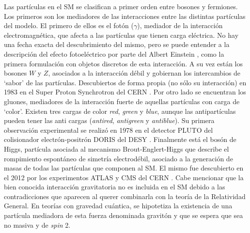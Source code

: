 Las partículas en el SM se clasifican a primer orden entre bosones y fermiones. Los primeros son los mediadores de las interacciones entre las distintas partículas del modelo. El primero de ellos es el fotón ($\gamma$), mediador de la interacción electromagnética, que afecta a las partículas que tienen carga eléctrica. No hay una fecha exacta del descubrimiento del mismo, pero se puede entender a la descripción del efecto fotoeléctrico por parte del Albert Einstein \cite{einstein}, como la primera formulación con objetos discretos de esta interacción. A su vez están los bosones $W$ y $Z$, asociados a la interacción débil y gobiernan los intercambios de `sabor' de las partículas. Descubiertos de forma propia (no sólo su interacción) en 1983 en el Super Proton Synchrotron del CERN . Por otro lado se encuentran los gluones, mediadores de la interacción fuerte de aquellas partículas con carga de `color'. Existen tres cargas de color \textit{red}, \textit{green} y \textit{blue}, aunque las antipartículas pueden tener las anti cargas (\textit{antired}, \textit{antigreen} y \textit{antiblue}). Su primera observación experimental se realizó en 1978 en el detector PLUTO del colisionador electrón-positrón DORIS del DESY \cite{gluon}. Finalmente está el bosón de Higgs, partícula asociada al mecanismo Brout-Englert-Higgs que describe el rompimiento espontáneo de simetría electrodébil, asociado a la generación de masas de todas las partículas que componen al SM. El mismo fue descubierto en el 2012 por los experimentos ATLAS y CMS del CERN \cite{higgs_atlas, higgs_cms}. Cabe mencionar que la bien conocida interacción gravitatoria no es incluida en el SM debido a las contradicciones que aparecen al querer combinarla con la teoría de la Relatividad General. En teorías con gravedad cuántica, se hipotetiza la existencia de una partícula mediadora de esta fuerza denominada gravitón y que se espera que sea no masiva y de \textit{spin} 2.

